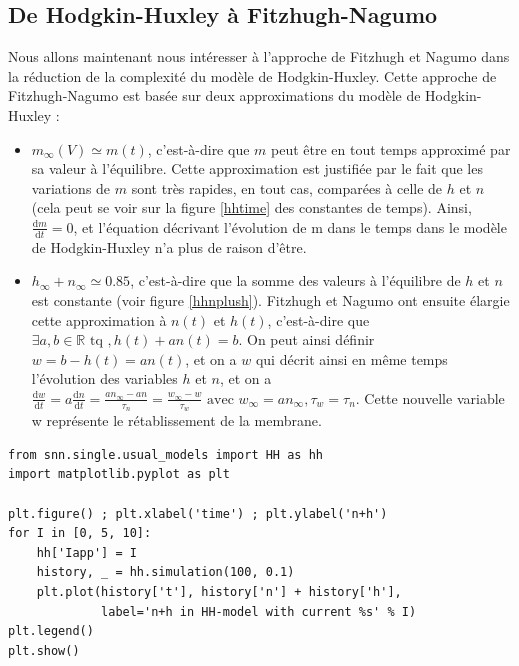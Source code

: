 \documentclass[12pt]{scrartcl}
\newcommand{\dd}{\mathrm{d}}
\begin{document}
\subsection{De Hodgkin-Huxley à Fitzhugh-Nagumo}
Nous allons maintenant nous intéresser à l'approche de Fitzhugh et Nagumo dans la réduction de la complexité du modèle de Hodgkin-Huxley. Cette approche de Fitzhugh-Nagumo est basée sur deux approximations du modèle de Hodgkin-Huxley : 
\begin{itemize}
\item $m_{\infty}(V) \simeq m(t)$, c'est-à-dire que $m$ peut être en tout temps approximé par sa valeur à l'équilibre. Cette approximation est justifiée par le fait que les variations de $m$ sont très rapides, en tout cas, comparées à celle de $h$ et $n$ (cela peut se voir sur la figure \ref{hhtime} des constantes de temps). Ainsi, $\frac{\dd m}{\dd t} = 0$, et l'équation décrivant l'évolution de m dans le temps dans le modèle de Hodgkin-Huxley n'a plus de raison d'être.
\item $h_\infty + n_\infty \simeq 0.85$, c'est-à-dire que la somme des valeurs à l'équilibre de $h$ et $n$ est constante (voir figure \ref{hhnplush}). Fitzhugh et Nagumo ont ensuite élargie cette approximation à $n(t)$ et $h(t)$, c'est-à-dire que $\exists a,b \in \mathbb{R} \text{ tq }, h(t) + an(t) = b$. On peut ainsi définir $w = b-h(t) = an(t)$, et on a $w$ qui décrit ainsi en même temps l'évolution des variables $h$ et $n$, et on a $\displaystyle \frac{\dd w}{\dd t} = a\frac{\dd n}{\dd t} = \frac{an_\infty -an}{\tau_n} = \frac{w_\infty-w}{\tau_w} \text{ avec } w_\infty=an_\infty, \tau_w = \tau_n$. Cette nouvelle variable w représente le rétablissement de la membrane. \end{itemize}

\begin{lstlisting}[caption = {Hodgkin-Huxley : Somme de n et h}]
from snn.single.usual_models import HH as hh
import matplotlib.pyplot as plt

plt.figure() ; plt.xlabel('time') ; plt.ylabel('n+h')
for I in [0, 5, 10]:
    hh['Iapp'] = I
    history, _ = hh.simulation(100, 0.1)
    plt.plot(history['t'], history['n'] + history['h'], 
             label='n+h in HH-model with current %s' % I)
plt.legend()
plt.show()
\end{lstlisting}
\end{document}
